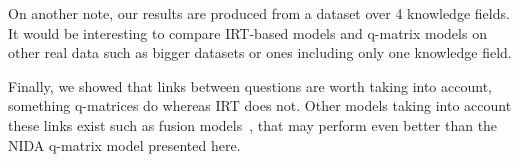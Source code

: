 \documentclass{sig-alternate}
\begin{document}

On another note, our results are produced from a dataset over 4 knowledge fields. It would be interesting to compare IRT-based models and q-matrix models on other real data such as bigger datasets or ones including only one knowledge field.

Finally, we showed that links between questions are worth taking into account, something q-matrices do whereas IRT does not. Other models taking into account these links exist such as fusion models~\citep{McGlohen2008}, that may perform even better than the NIDA q-matrix model presented here.








%

%
%

\end{document}
